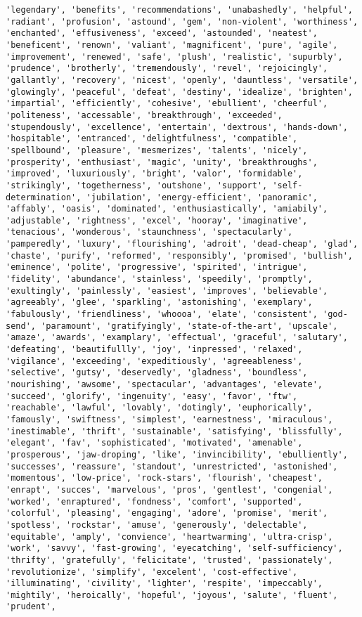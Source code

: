\documentclass[11pt]{article}
\begin{document}
\begin{Verbatim}[commandchars=\\\{\}]
'legendary', 'benefits', 'recommendations', 'unabashedly', 'helpful', 'radiant', 'profusion', 'astound', 'gem', 'non-violent', 'worthiness', 'enchanted', 'effusiveness', 'exceed', 'astounded', 'neatest', 'beneficent', 'renown', 'valiant', 'magnificent', 'pure', 'agile', 'improvement', 'renewed', 'safe', 'plush', 'realistic', 'supurbly', 'prudence', 'brotherly', 'tremendously', 'revel', 'rejoicingly', 'gallantly', 'recovery', 'nicest', 'openly', 'dauntless', 'versatile', 'glowingly', 'peaceful', 'defeat', 'destiny', 'idealize', 'brighten', 'impartial', 'efficiently', 'cohesive', 'ebullient', 'cheerful', 'politeness', 'accessable', 'breakthrough', 'exceeded', 'stupendously', 'excellence', 'entertain', 'dextrous', 'hands-down', 'hospitable', 'entranced', 'delightfulness', 'compatible', 'spellbound', 'pleasure', 'mesmerizes', 'talents', 'nicely', 'prosperity', 'enthusiast', 'magic', 'unity', 'breakthroughs', 'improved', 'luxuriously', 'bright', 'valor', 'formidable', 'strikingly', 'togetherness', 'outshone', 'support', 'self-determination', 'jubilation', 'energy-efficient', 'panoramic', 'affably', 'oasis', 'dominated', 'enthusiastically', 'amiabily', 'adjustable', 'rightness', 'excel', 'hooray', 'imaginative', 'tenacious', 'wonderous', 'staunchness', 'spectacularly', 'pamperedly', 'luxury', 'flourishing', 'adroit', 'dead-cheap', 'glad', 'chaste', 'purify', 'reformed', 'responsibly', 'promised', 'bullish', 'eminence', 'polite', 'progressive', 'spirited', 'intrigue', 'fidelity', 'abundance', 'stainless', 'speedily', 'promptly', 'exultingly', 'painlessly', 'easiest', 'improves', 'believable', 'agreeably', 'glee', 'sparkling', 'astonishing', 'exemplary', 'fabulously', 'friendliness', 'whoooa', 'elate', 'consistent', 'god-send', 'paramount', 'gratifyingly', 'state-of-the-art', 'upscale', 'amaze', 'awards', 'examplary', 'effectual', 'graceful', 'salutary', 'defeating', 'beautifullly', 'joy', 'inpressed', 'relaxed', 'vigilance', 'exceeding', 'expeditiously', 'agreeableness', 'selective', 'gutsy', 'deservedly', 'gladness', 'boundless', 'nourishing', 'awsome', 'spectacular', 'advantages', 'elevate', 'succeed', 'glorify', 'ingenuity', 'easy', 'favor', 'ftw', 'reachable', 'lawful', 'lovably', 'dotingly', 'euphorically', 'famously', 'swiftness', 'simplest', 'earnestness', 'miraculous', 'inestimable', 'thrift', 'sustainable', 'satisfying', 'blissfully', 'elegant', 'fav', 'sophisticated', 'motivated', 'amenable', 'prosperous', 'jaw-droping', 'like', 'invincibility', 'ebulliently', 'successes', 'reassure', 'standout', 'unrestricted', 'astonished', 'momentous', 'low-price', 'rock-stars', 'flourish', 'cheapest', 'enrapt', 'succes', 'marvelous', 'pros', 'gentlest', 'congenial', 'worked', 'enraptured', 'fondness', 'comfort', 'supported', 'colorful', 'pleasing', 'engaging', 'adore', 'promise', 'merit', 'spotless', 'rockstar', 'amuse', 'generously', 'delectable', 'equitable', 'amply', 'convience', 'heartwarming', 'ultra-crisp', 'work', 'savvy', 'fast-growing', 'eyecatching', 'self-sufficiency', 'thrifty', 'gratefully', 'felicitate', 'trusted', 'passionately', 'revolutionize', 'simplify', 'excelent', 'cost-effective', 'illuminating', 'civility', 'lighter', 'respite', 'impeccably', 'mightily', 'heroically', 'hopeful', 'joyous', 'salute', 'fluent', 'prudent', 
\end{Verbatim}
\end{document}
